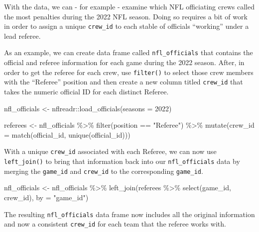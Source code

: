 \documentclass[
  letterpaper,
]{krantz}
\newenvironment{Shaded}{\begin{snugshade}}{\end{snugshade}}
\newcommand{\AttributeTok}[1]{\textcolor[rgb]{0.40,0.45,0.13}{#1}}
\newcommand{\DecValTok}[1]{\textcolor[rgb]{0.68,0.00,0.00}{#1}}
\newcommand{\FunctionTok}[1]{\textcolor[rgb]{0.28,0.35,0.67}{#1}}
\newcommand{\NormalTok}[1]{\textcolor[rgb]{0.00,0.23,0.31}{#1}}
\newcommand{\OtherTok}[1]{\textcolor[rgb]{0.00,0.23,0.31}{#1}}
\newcommand{\SpecialCharTok}[1]{\textcolor[rgb]{0.37,0.37,0.37}{#1}}
\newcommand{\StringTok}[1]{\textcolor[rgb]{0.13,0.47,0.30}{#1}}
\begin{document}
With the data, we can - for example - examine which NFL officiating
crews called the most penalties during the 2022 NFL season. Doing so
requires a bit of work in order to assign a unique \texttt{crew\_id} to
each stable of officials ``working'' under a lead referee.

As an example, we can create data frame called \texttt{nfl\_officials}
that contains the official and referee information for each game during
the 2022 season. After, in order to get the referee for each crew, use
\texttt{filter()} to select those crew members with the ``Referee''
position and then create a new column titled \texttt{crew\_id} that
takes the numeric official ID for each distinct Referee.

\begin{Shaded}
\begin{Highlighting}[]
\NormalTok{nfl\_officials }\OtherTok{\textless{}{-}}\NormalTok{ nflreadr}\SpecialCharTok{::}\FunctionTok{load\_officials}\NormalTok{(}\AttributeTok{seasons =} \DecValTok{2022}\NormalTok{)}

\NormalTok{referees }\OtherTok{\textless{}{-}}\NormalTok{ nfl\_officials }\SpecialCharTok{\%\textgreater{}\%}
  \FunctionTok{filter}\NormalTok{(position }\SpecialCharTok{==} \StringTok{"Referee"}\NormalTok{) }\SpecialCharTok{\%\textgreater{}\%}
  \FunctionTok{mutate}\NormalTok{(}\AttributeTok{crew\_id =} \FunctionTok{match}\NormalTok{(official\_id, }\FunctionTok{unique}\NormalTok{(official\_id)))}
\end{Highlighting}
\end{Shaded}

With a unique \texttt{crew\_id} associated with each Referee, we can now
use \texttt{left\_join()} to bring that information back into our
\texttt{nfl\_officials} data by merging the \texttt{game\_id} and
\texttt{crew\_id} to the corresponding \texttt{game\_id}.

\begin{Shaded}
\begin{Highlighting}[]
\NormalTok{nfl\_officials }\OtherTok{\textless{}{-}}\NormalTok{ nfl\_officials }\SpecialCharTok{\%\textgreater{}\%}
  \FunctionTok{left\_join}\NormalTok{(referees }\SpecialCharTok{\%\textgreater{}\%} \FunctionTok{select}\NormalTok{(game\_id, crew\_id), }\AttributeTok{by =} \StringTok{"game\_id"}\NormalTok{)}
\end{Highlighting}
\end{Shaded}

The resulting \texttt{nfl\_officials} data frame now includes all the
original information and now a consistent \texttt{crew\_id} for each
team that the referee works with.
\end{document}
